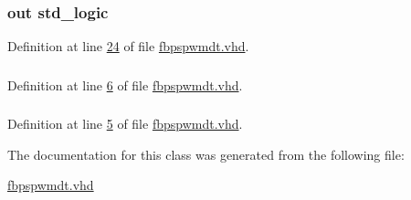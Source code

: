 \hypertarget{classfbpspwmdt_a0b2d13e9c0fd854957d88a65e0905e5b}{}
\subsubsection[{port\+\_\+\+P\+W\+M02}]{ {\bfseries \textcolor{keywordflow}{out}\textcolor{vhdlchar}{ }} {\bfseries \textcolor{comment}{std\+\_\+logic}\textcolor{vhdlchar}{ }} \hspace{0.3cm}{\ttfamily [Port]}}\label{classfbpspwmdt_a0b2d13e9c0fd854957d88a65e0905e5b}


Definition at line \hyperlink{fbpspwmdt_8vhd_source_l00024}{24} of file \hyperlink{fbpspwmdt_8vhd_source}{fbpspwmdt.\+vhd}.

\hypertarget{classfbpspwmdt_aa4b2b25246a821511120e3149b003563}{}
\subsubsection[{S\+T\+D\+\_\+\+L\+O\+G\+I\+C\+\_\+1164}]{\hspace{0.3cm}{\ttfamily [Package]}}\label{classfbpspwmdt_aa4b2b25246a821511120e3149b003563}


Definition at line \hyperlink{fbpspwmdt_8vhd_source_l00006}{6} of file \hyperlink{fbpspwmdt_8vhd_source}{fbpspwmdt.\+vhd}.

\hypertarget{classfbpspwmdt_a241c3e72dd8024cc8ae831b1b2aed7db}{}
\subsubsection[{S\+T\+D\+\_\+\+L\+O\+G\+I\+C\+\_\+\+U\+N\+S\+I\+G\+N\+E\+D}]{\hspace{0.3cm}{\ttfamily [Package]}}\label{classfbpspwmdt_a241c3e72dd8024cc8ae831b1b2aed7db}


Definition at line \hyperlink{fbpspwmdt_8vhd_source_l00005}{5} of file \hyperlink{fbpspwmdt_8vhd_source}{fbpspwmdt.\+vhd}.



The documentation for this class was generated from the following file\+:\begin{DoxyCompactItemize}
\item 
\hyperlink{fbpspwmdt_8vhd}{fbpspwmdt.\+vhd}\end{DoxyCompactItemize}
